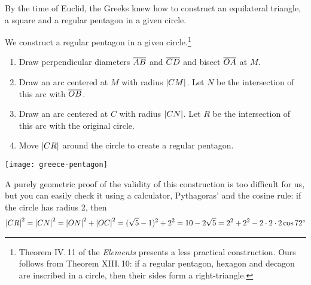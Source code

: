 \medbreak

By the time of Euclid, the Greeks knew how to construct an equilateral triangle, a square and a regular pentagon in a given circle.

\goodbreak

 We construct a regular pentagon in a given circle.\footnote{%
 	Theorem IV.\,11 of the \emph{Elements} presents a less practical construction. Ours follows from Theorem XIII.\,10: if a regular pentagon, hexagon and decagon are inscribed in a circle, then their sides form a right-triangle.%
}

\begin{minipage}[t]{0.69\linewidth}\vspace{-5pt}
	\begin{enumerate}\itemsep0pt
	  \item Draw perpendicular diameters $\cl{AB}$ and $\cl{CD}$ and bisect $\cl{OA}$ at $M$.
	  \item Draw an arc centered at $M$ with radius $\nm{CM}$. Let $N$ be the intersection of this arc with $\cl{OB}$.
	  \item Draw an arc centered at $C$ with radius $\nm{CN}$. Let $R$ be the intersection of this arc with the original circle.
		\item Move $\nm{CR}$ around the circle to create a regular pentagon.
	\end{enumerate}
\end{minipage}
\hfill
\begin{minipage}[t]{0.3\linewidth}\vspace{-22pt}
	\flushright
	\texttt{[image: greece-pentagon]}
\end{minipage}
\smallbreak


A purely geometric proof of the validity of this construction is too difficult for us, but you can easily check it using a calculator, Pythagoras' and the cosine rule:  if the circle has radius 2, then
\begin{align*}
	\nm{CR}^2 =\nm{CN}^2
	=\nm{ON}^2+\nm{OC}^2
	=(\sqrt 5-1)^2+2^2=10-2\sqrt 5 
	=2^2+2^2-2\cdot 2\cdot 2\cos\ang{72}
\end{align*}


